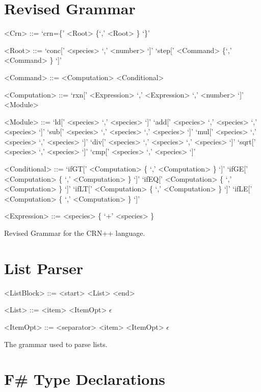 
\begin{appendices}

\section{Revised Grammar}
\begin{Grammar}
\begin{grammar}

<Crn> ::= `crn=\{' <Root> \{`,' <Root> \} `\}' 

<Root> ::= `conc[' <species> `,' <number> `]' \alt `step[' <Command> \{`,' <Command> \} `]'

<Command> ::= <Computation> \alt <Conditional>

<Computation> ::= `rxn[' <Expression> `,' <Expression> `,' <number> `]' \alt <Module>

<Module> ::= `ld[' <species> `,' <species> `]'
\alt `add[' <species> `,' <species> `,' <species> `]'
\alt `sub[' <species> `,' <species> `,' <species> `]'
\alt `mul[' <species> `,' <species> `,' <species> `]'
\alt `div[' <species> `,' <species> `,' <species> `]'
\alt `sqrt[' <species> `,' <species> `]'
\alt `cmp[' <species> `,' <species> `]'

<Conditional> ::= `ifGT[' <Computation> \{ `,' <Computation> \} `]'
\alt `ifGE[' <Computation> \{ `,' <Computation> \} `]'
\alt `ifEQ[' <Computation> \{ `,' <Computation> \} `]'
\alt `ifLT[' <Computation> \{ `,' <Computation> \} `]'
\alt `ifLE[' <Computation> \{ `,' <Computation> \} `]'

<Expression> ::= <species> \{ `+' <species> \}
\end{grammar}
\caption{Revised Grammar for the CRN++ language.}
\label{lst:grammar}
\end{Grammar}

\section{List Parser}
\begin{Grammar}
\begin{grammar}
<ListBlock> ::= <start> <List> <end>

<List> ::= <item> <ItemOpt> \alt $\epsilon$

<ItemOpt> ::= <separator> <item> <ItemOpt> \alt $\epsilon$
\end{grammar}
\caption{The grammar used to parse lists.}
\label{lst:listGrammar}
\end{Grammar}

\newpage

\section{F\# Type Declarations}

\end{appendices}